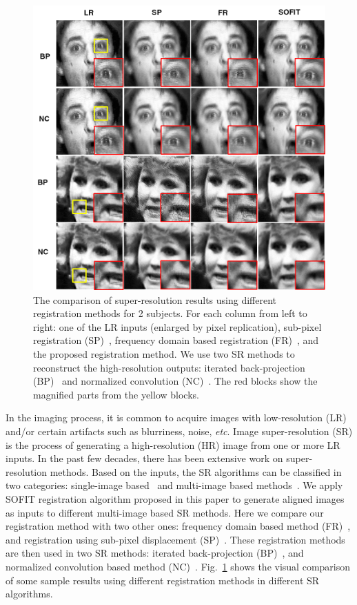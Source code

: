 \documentclass[10pt,journal]{IEEEtran}
\begin{document}
\begin{figure}[t]
	\centering
		\includegraphics[width=\columnwidth]{fig/superResolution.png}
	\caption{The comparison of super-resolution results using different registration methods for 2 subjects. For each column from left to right: one of the LR inputs (enlarged by pixel replication), sub-pixel registration (SP)~\cite{Keren_CVPR88}, frequency domain based registration (FR)~\cite{Vandewalle06}, and the proposed registration method. We use two SR methods to reconstruct the high-resolution outputs: iterated back-projection (BP)~\cite{Irani91} and normalized convolution (NC)~\cite{Pham_06}. The red blocks show the magnified parts from the yellow blocks.}
	\label{fig:superResolution}
\end{figure}



In the imaging process, it is common to acquire images with low-resolution (LR) and/or certain artifacts such as blurriness, noise, \textit{etc}. Image super-resolution (SR) is the process of generating a high-resolution (HR) image from one or more LR inputs. In the past few decades, there has been extensive work on super-resolution methods. Based on the inputs, the SR algorithms can be classified in two categories: single-image based~\cite{Sun_CVPR08} and multi-image based methods~\cite{Irani91}. We apply SOFIT registration algorithm proposed in this paper to generate aligned images as inputs to different multi-image based SR methods. Here we compare our registration method with two other ones: frequency domain based method (FR)~\cite{Vandewalle06}, and registration using sub-pixel displacement (SP)~\cite{Keren_CVPR88}. These registration methods are then used in two SR methods: iterated back-projection (BP)~\cite{Irani91}, and normalized convolution based method (NC)~\cite{Pham_06}. Fig.~\ref{fig:superResolution} shows the visual comparison of some sample results using different registration methods in different SR algorithms.
\end{document}
